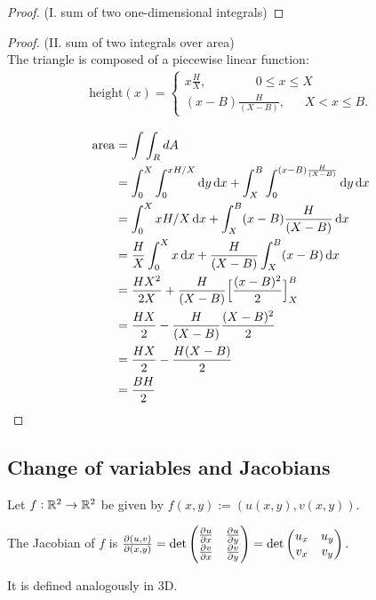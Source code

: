 \begin{proof}(I. sum of two one-dimensional integrals)
\end{proof}

\begin{proof}(II. sum of two integrals over area)\\
  The triangle is composed of a piecewise linear function:
  \begin{align*}
    \text{height}(x) =
    \begin{cases}
      x\frac{H}{X}, ~~~~~~~~~~~~~~~~~~     0 \leq x \leq X\\
      (x - B)\frac{H}{(X - B)}, ~~~~~~~ X < x \leq B.
    \end{cases}
  \end{align*}

  \begin{align*}
    \text{area} &= \int\int_R dA\\
                &= \int_0^X \int_0^{xH/X} \dy \dx + \int_X^B\int_0^{(x - B)\frac{H}{(X - B)}}\dy\dx\\
                &= \int_0^X xH/X \dx + \int_X^B (x - B)\frac{H}{(X - B)} \dx\\
                &= \frac{H}{X}\int_0^X x \dx + \frac{H}{(X - B)}\int_X^B (x - B) \dx\\
                &= \frac{HX^2}{2X} + \frac{H}{(X - B)}\Big[\frac{(x - B)^2}{2}\Big]_X^B\\
                &= \frac{HX}{2} - \frac{H}{(X - B)}\frac{(X - B)^2}{2}\\
                &= \frac{HX}{2} - \frac{H(X - B)}{2}\\
                &= \frac{BH}{2}
  \end{align*}
\end{proof}

\subsection{Change of variables and Jacobians}

\begin{definition*}[Jacobian]
  Let $f:\mathbb{R}^2 \to \mathbb{R}^2$ be given by $f(x, y) := (u(x, y), v(x, y))$.

  The Jacobian of $f$ is
  $
  \frac{\partial(u, v)}{\partial(x, y)} =
  \det \begin{pmatrix}\frac{\partial u}{\partial x} & \frac{\partial u}{\partial y}\\\frac{\partial v}{\partial x} & \frac{\partial v}{\partial y}\\ \end{pmatrix}
  = \det \begin{pmatrix}u_x & u_y\\v_x & v_y\\ \end{pmatrix}.
  $

  It is defined analogously in 3D.
\end{definition*}

